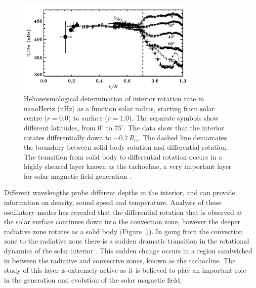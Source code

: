 \begin{figure}[!t]
\begin{center}
\includegraphics[trim = 0cm 0.5cm 0cm 0cm, width=0.8\textwidth]{images/differential_rot.png}
\caption[Differential rotation rate as a function of latitude and depth]{Helioseismological determination of interior rotation rate in nanoHertz (nHz) as a function solar radius, starting from solar centre ($r=0.0$) to surface ($r=1.0$). The separate symbols show different latitudes, from $0^{\circ}$ to $75^{\circ}$. The data show that the interior rotates differentially down to $\sim$$0.7\,R_{\odot}$. The dashed line demarcates the boundary between solid body rotation and differential rotation. The transition from solid body to differential rotation occurs in a highly sheared layer known as the tachocline, a very important layer for solar magnetic field generation \citep{thompson2003}.}
\label{fig:diff_rot} 
\end{center}
\end{figure}

Different wavelengths probe different depths in the interior, and can provide information on density, sound speed and temperature.
Analysis of these oscillatory modes has revealed that the differential rotation that is observed at the solar surface continues down into the convection zone, however the deeper radiative zone rotates as a solid body (Figure~\ref{fig:diff_rot}). In going from the convection zone to the radiative zone there is a sudden dramatic transition in the rotational dynamics of the solar interior \citep{thompson2003}. This sudden change occurs in a region sandwiched in between the radiative and convective zones, known as the tachocline. The study of this layer is extremely active as it is believed to play an important role in the generation and evolution of the solar magnetic field.


